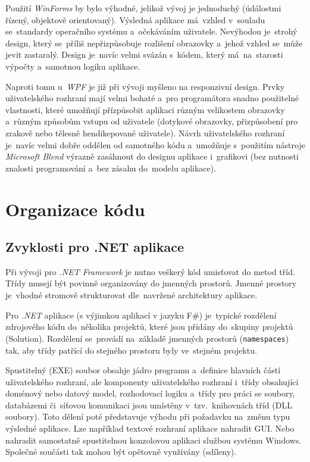 \documentclass[12pt]{article}
\begin{document}
Použití \emph{WinForms} by bylo výhodné, jelikož vývoj je jednoduchý (údálostmi řízený, objektově orientovaný). Výsledná aplikace má~vzhled v~souladu se~standardy operačního systému a~očekáváním uživatele. Nevýhodou je~strohý design, který se~příliš nepřizpůsobuje rozlišení obrazovky a~jehož vzhled se~může jevit zastaralý. Design je~navíc velmi svázán s~kódem, který má~na~starosti výpočty a~samotnou logiku aplikace.

Naproti tomu u~\emph{WPF} je již při vývoji myšleno na responzivní design. Prvky uživatelského rozhraní mají velmi bohaté a~pro programátora snadno použitelné vlastnosti, které umožňují přízpůsobit aplikaci různým velikostem obrazovky a~různým způsobům vstupu od uživatele (dotykové obrazovky, přizpůsobení pro zrakově nebo tělesně hendikepované uživatele). Návrh uživatelského rozhraní je~navíc velmi dobře oddělen od samotného kódu a~umožňuje s~použitím nástroje \emph{Microsoft Blend} výrazně zasáhnout do designu aplikace i~grafikovi (bez nutnosti znalosti programování a~bez zásahu do~modelu aplikace).

\section{Organizace kódu}
\subsection{Zvyklosti pro .NET aplikace}
Při vývoji pro \emph{.NET Framework} je nutno veškerý kód umisťovat do metod tříd. Třídy musejí být povinně organizovány do jmenných prostorů. Jmenné prostory je~vhodné stromově strukturovat dle~navržené architektury aplikace.

Pro \emph{.NET} aplikace (s výjimkou aplikací v jazyku F\#) je~typické rozdělení zdrojového kódu do~několika projektů, které jsou přidány do~skupiny projektů (Solution). Rozdělení se~provádí na~základě jmenných prostorů (\texttt{namespaces}) tak, aby třídy patřící do stejného prostoru byly ve~stejném projektu. 

Spustitelný (EXE) soubor obsahje jádro programu a~definice hlavních částí uživatelského rozhraní, ale komponenty uživatelského rozhraní i~třídy obsahující doménový nebo datový model, rozhodovací logiku a~třídy pro práci se soubory, databázemi či~síťovou komunikaci jsou umístěny v~tzv.~knihovnách tříd (DLL soubory). Toto dělení poté představuje výhodu při požadavku na~změnu typu výsledné aplikace. Lze například textové rozhraní aplikace nahradit GUI. Nebo nahradit samostatně spustitelnou konzolovou aplikaci službou systému Windows. Společné součásti tak mohou být opětovně využívány (sdíleny).
\end{document}
